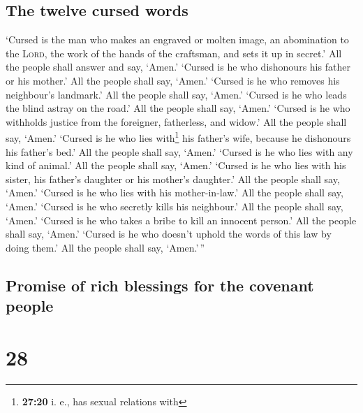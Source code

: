 \hypertarget{the-twelve-cursed-words}{%
\subsection{The twelve cursed words}\label{the-twelve-cursed-words}}

 `Cursed is the man who makes an engraved or molten
image, an abomination to the \textsc{Lord}, the work of the hands of the
craftsman, and sets it up in secret.' All the people shall answer and
say, `Amen.'  `Cursed is he who dishonours his father or
his mother.' All the people shall say, `Amen.'  `Cursed
is he who removes his neighbour's landmark.' All the people shall say,
`Amen.'  `Cursed is he who leads the blind astray on the
road.' All the people shall say, `Amen.'  `Cursed is he
who withholds justice from the foreigner, fatherless, and widow.' All
the people shall say, `Amen.'  `Cursed is he who lies
with\footnote{\textbf{27:20} i. e., has sexual relations with} his
father's wife, because he dishonours his father's bed.' All the people
shall say, `Amen.'  `Cursed is he who lies with any kind
of animal.' All the people shall say, `Amen.'  `Cursed is
he who lies with his sister, his father's daughter or his mother's
daughter.' All the people shall say, `Amen.'  `Cursed is
he who lies with his mother-in-law.' All the people shall say, `Amen.'
 `Cursed is he who secretly kills his neighbour.' All the
people shall say, `Amen.'  `Cursed is he who takes a
bribe to kill an innocent person.' All the people shall say, `Amen.'
 `Cursed is he who doesn't uphold the words of this law
by doing them.' All the people shall say, `Amen.'\,''

\hypertarget{promise-of-rich-blessings-for-the-covenant-people}{%
\subsection{Promise of rich blessings for the covenant
people}\label{promise-of-rich-blessings-for-the-covenant-people}}

\hypertarget{section-27}{%
\section{28}\label{section-27}}

